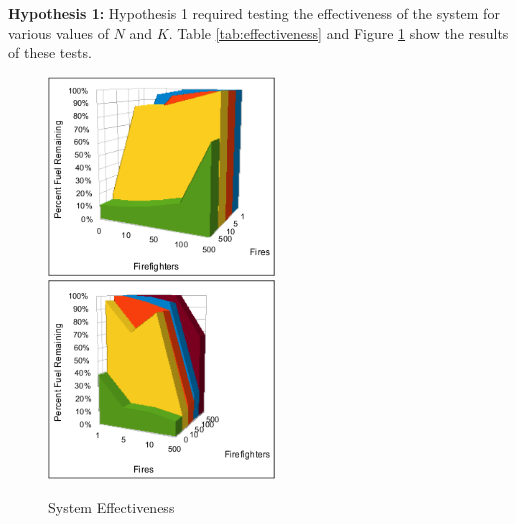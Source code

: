 \documentclass{article}
\begin{document}
\begin{description}
  \item \textbf{Hypothesis 1:}
    Hypothesis 1 required testing the effectiveness of the system for various
    values of $N$ and $K$.  Table \ref{tab:effectiveness} and Figure
    \ref{fig:effectiveness} show the results of these tests.

    \begin{figure}[htp]
      \centering
      \includegraphics[width=60mm]{images/effectiveness1.png}
      \includegraphics[width=60mm]{images/effectiveness2.png}
      \caption{System Effectiveness}\label{fig:effectiveness}
    \end{figure}


\end{description}
\end{document}
